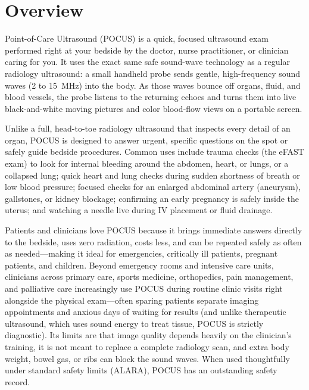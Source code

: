 \label{ch:infographic-pocus}

\section{Overview}

Point-of-Care Ultrasound (POCUS) is a quick, focused ultrasound exam performed right at your bedside by the doctor, nurse practitioner, or clinician caring for you. It uses the exact same safe sound-wave technology as a regular radiology ultrasound: a small handheld probe sends gentle, high-frequency sound waves (2 to 15~MHz) into the body. As those waves bounce off organs, fluid, and blood vessels, the probe listens to the returning echoes and turns them into live black-and-white moving pictures and color blood-flow views on a portable screen.

Unlike a full, head-to-toe radiology ultrasound that inspects every detail of an organ, POCUS is designed to answer urgent, specific questions on the spot or safely guide bedside procedures. Common uses include trauma checks (the eFAST exam) to look for internal bleeding around the abdomen, heart, or lungs, or a collapsed lung; quick heart and lung checks during sudden shortness of breath or low blood pressure; focused checks for an enlarged abdominal artery (aneurysm), gallstones, or kidney blockage; confirming an early pregnancy is safely inside the uterus; and watching a needle live during IV placement or fluid drainage.

Patients and clinicians love POCUS because it brings immediate answers directly to the bedside, uses zero radiation, costs less, and can be repeated safely as often as needed---making it ideal for emergencies, critically ill patients, pregnant patients, and children. Beyond emergency rooms and intensive care units, clinicians across primary care, sports medicine, orthopedics, pain management, and palliative care increasingly use POCUS during routine clinic visits right alongside the physical exam---often sparing patients separate imaging appointments and anxious days of waiting for results (and unlike therapeutic ultrasound, which uses sound energy to treat tissue, POCUS is strictly diagnostic). Its limits are that image quality depends heavily on the clinician's training, it is not meant to replace a complete radiology scan, and extra body weight, bowel gas, or ribs can block the sound waves. When used thoughtfully under standard safety limits (ALARA), POCUS has an outstanding safety record.


